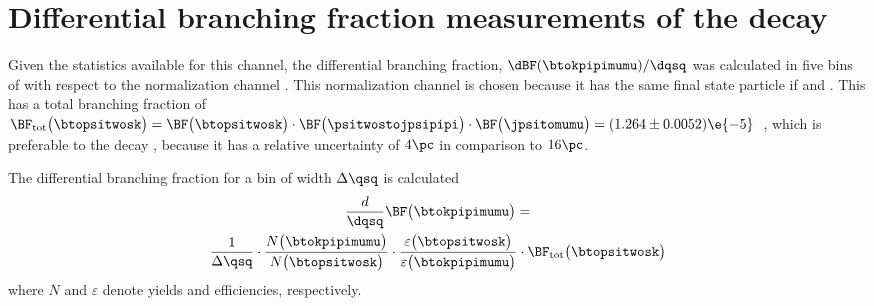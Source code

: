 \section[Differential branching fraction measurements of the decay \btokpipimumu]
{Differential branching fraction measurements of the decay \tmath{\btokpipimumu}}

Given the statistics available for this channel, the differential branching fraction,
$\dBF(\btokpipimumu)/\dqsq$ was calculated in five bins of \qsq with respect to the normalization
channel \btopsitwosk.
This normalization channel is chosen because it has the same final state particle if
\psitwostojpsipipi and \jpsitomumu.
This has a total branching fraction of
$\BF_\mathrm{tot}\big(\btopsitwosk\big) = \BF\big(\btopsitwosk\big) \cdot
\BF\big(\psitwostojpsipipi\big) \cdot \BF\big(\jpsitomumu\big)=(1.264 \pm
0.0052)\e{-5}$~\cite{PDG2012}, which is preferable to the decay \btojpsikpipi, because
it has a relative uncertainty of $4\pc$ in comparison to $16\pc$.

The differential branching fraction for a bin of width $\Delta\qsq$ is calculated
\begin{multline}
  \frac{d}{\dqsq}\BF\big(\btokpipimumu\big)=
  \\
  \frac{1}{\Delta\qsq} \cdot
  \frac{N\big(\btokpipimumu\big)}{N\big(\btopsitwosk\big)} \cdot
  \frac{\varepsilon\big(\btopsitwosk\big)}{\varepsilon\big(\btokpipimumu\big)} \cdot
  \BF_\mathrm{tot}\big(\btopsitwosk\big)
  \label{eq:kpipi:diffbf}
\end{multline}
where $N$ and $\varepsilon$ denote yields and efficiencies, respectively.


